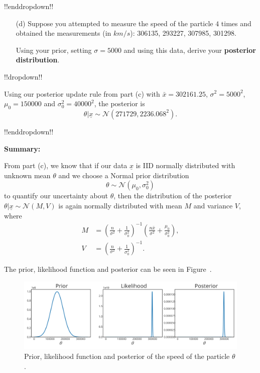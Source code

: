{!!enddropdown!!

\clearpage

\begin{itemize}
\item [(d)] Suppose you attempted to measure the speed of the particle $4$ times and obtained the measurements (in $km/s$): 306135, 293227, 307985, 301298.

Using your prior, setting $\sigma = 5000$ and using this data, derive your \textbf{\color{darkblue}posterior distribution}.
\end{itemize}
!!dropdown!!

Using our posterior update rule from part (c) with $\bar{x} = 302161.25$, $\sigma^2 = 5000^2$, $\mu_0 = 150000$ and $\sigma_0^2 = 40000^2$, the posterior is
    $$ \theta | \underline{x} \sim \mathcal{N}(271729, 2236.068^2).$$

!!enddropdown!!

\textbf{Summary:}

From part (c), we know that if our data $\underline{x}$ is IID normally distributed with unknown mean $\theta$ and we choose a Normal prior distribution 
$$\theta \sim \mathcal{N}(\mu_0,\sigma^2_0)$$
to quantify our uncertainty about $\theta$, then the distribution of the posterior $\theta|\underline{x}\sim \mathcal{N}(M, V)$ is again normally distributed with mean $M$ and variance $V$, where
\begin{align*}
    M &= \left(\frac{n}{\sigma^2} + \frac{1}{\sigma_0^2}\right)^{-1}\left(\frac{n\bar{x}}{\sigma^2} + \frac{\mu_0}{\sigma_0^2}\right), \\
    V &= \left(\frac{n}{\sigma^2} + \frac{1}{\sigma_0^2}\right)^{-1}.
\end{align*}

The prior, likelihood function and posterior can be seen in Figure~.

\begin{figure}[h] 

\includegraphics{images/speed_priorposterior.svg}
\caption{Prior, likelihood function and posterior of the speed of the particle $\theta$.}

\label{fig:speed}
\end{figure}}


